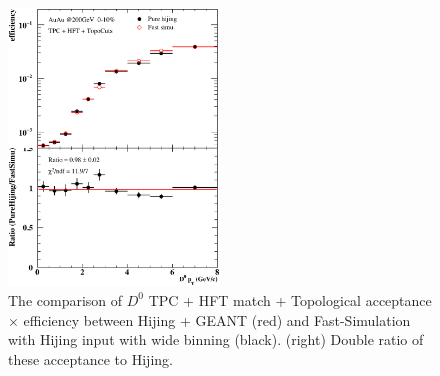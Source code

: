 
\begin{figure}[htbp]
\centering
\includegraphics[keepaspectratio,width=0.5\textwidth,angle=0]{figure/Run14_D0HFT/TpcHftTopo_0_10.eps}
\caption{The comparison of $D^0$ TPC + HFT match + Topological acceptance $\times$ efficiency between Hijing + GEANT (red) and Fast-Simulation with Hijing input with wide binning (black). (right) Double ratio of these acceptance to Hijing.}
\label{d0hfttopoeff2}
\end{figure}


